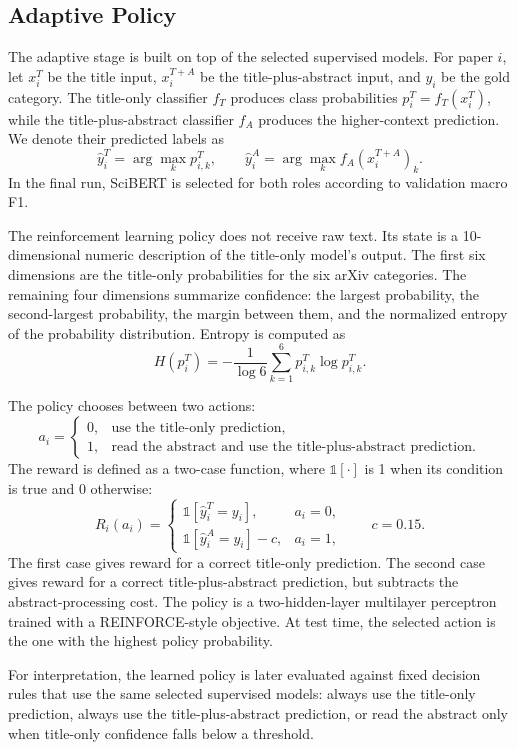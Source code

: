 \documentclass{article}
\begin{document}
\subsection{Adaptive Policy}

The adaptive stage is built on top of the selected supervised models. For paper \(i\), let \(x_i^T\) be the title input, \(x_i^{T+A}\) be the title-plus-abstract input, and \(y_i\) be the gold category. The title-only classifier \(f_T\) produces class probabilities \(p_i^T=f_T(x_i^T)\), while the title-plus-abstract classifier \(f_A\) produces the higher-context prediction. We denote their predicted labels as
\[
\hat{y}_i^T=\arg\max_k p_{i,k}^T,
\qquad
\hat{y}_i^A=\arg\max_k f_A(x_i^{T+A})_k .
\]
In the final run, SciBERT is selected for both roles according to validation macro F1.

The reinforcement learning policy does not receive raw text. Its state is a 10-dimensional numeric description of the title-only model's output. The first six dimensions are the title-only probabilities for the six arXiv categories. The remaining four dimensions summarize confidence: the largest probability, the second-largest probability, the margin between them, and the normalized entropy of the probability distribution. Entropy is computed as
\[
H(p_i^T) =
-\frac{1}{\log 6}\sum_{k=1}^{6}p_{i,k}^T\log p_{i,k}^T .
\]

The policy chooses between two actions:
\[
a_i =
\begin{cases}
0, & \text{use the title-only prediction}, \\
1, & \text{read the abstract and use the title-plus-abstract prediction}.
\end{cases}
\]
The reward is defined as a two-case function, where \(\mathbb{1}[\cdot]\) is 1 when its condition is true and 0 otherwise:
\[
R_i(a_i) =
\begin{cases}
\mathbb{1}\!\left[\hat{y}_i^T=y_i\right], & a_i=0, \\
\mathbb{1}\!\left[\hat{y}_i^A=y_i\right] - c, & a_i=1,
\end{cases}
\qquad c=0.15.
\]
The first case gives reward for a correct title-only prediction. The second case gives reward for a correct title-plus-abstract prediction, but subtracts the abstract-processing cost.
The policy is a two-hidden-layer multilayer perceptron trained with a REINFORCE-style objective. At test time, the selected action is the one with the highest policy probability.

For interpretation, the learned policy is later evaluated against fixed decision rules that use the same selected supervised models: always use the title-only prediction, always use the title-plus-abstract prediction, or read the abstract only when title-only confidence falls below a threshold.
\end{document}
